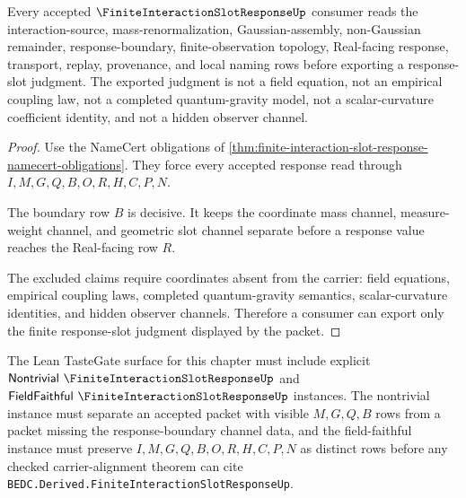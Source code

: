 \begin{theorem}
\label{thm:finite-interaction-slot-response-nonescape}
Every accepted $\FiniteInteractionSlotResponseUp$ consumer reads the interaction-source, mass-renormalization, Gaussian-assembly, non-Gaussian remainder, response-boundary, finite-observation topology, Real-facing response, transport, replay, provenance, and local naming rows before exporting a response-slot judgment. The exported judgment is not a field equation, not an empirical coupling law, not a completed quantum-gravity model, not a scalar-curvature coefficient identity, and not a hidden observer channel.
\end{theorem}
\begin{proof}
Use the NameCert obligations of \autoref{thm:finite-interaction-slot-response-namecert-obligations}. They force every accepted response read through $I,M,G,Q,B,O,R,H,C,P,N$.

The boundary row $B$ is decisive. It keeps the coordinate mass channel, measure-weight channel, and geometric slot channel separate before a response value reaches the Real-facing row $R$.

The excluded claims require coordinates absent from the carrier: field equations, empirical coupling laws, completed quantum-gravity semantics, scalar-curvature identities, and hidden observer channels. Therefore a consumer can export only the finite response-slot judgment displayed by the packet.
\end{proof}



The Lean TasteGate surface for this chapter must include explicit $\mathsf{Nontrivial}\ \FiniteInteractionSlotResponseUp$ and $\mathsf{FieldFaithful}\ \FiniteInteractionSlotResponseUp$ instances. The nontrivial instance must separate an accepted packet with visible $M,G,Q,B$ rows from a packet missing the response-boundary channel data, and the field-faithful instance must preserve $I,M,G,Q,B,O,R,H,C,P,N$ as distinct rows before any checked carrier-alignment theorem can cite \texttt{BEDC.Derived.FiniteInteractionSlotResponseUp}.

